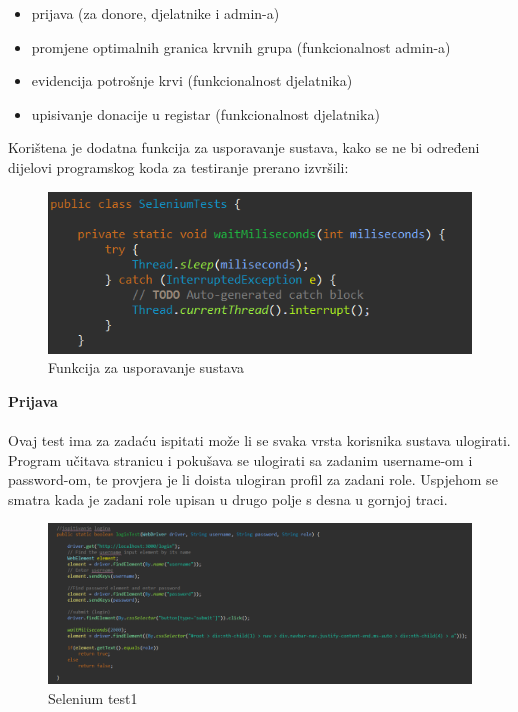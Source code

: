 			 \begin{itemize}
			 	\item {prijava (za donore, djelatnike i admin-a)}
			 	\item {promjene optimalnih granica krvnih grupa (funkcionalnost admin-a)}
			 	\item {evidencija potrošnje krvi (funkcionalnost djelatnika)}
			 	\item {upisivanje donacije u registar (funkcionalnost djelatnika)}
			 	
			 \end{itemize}
		 Korištena je dodatna funkcija za usporavanje sustava, kako se ne bi određeni dijelovi programskog koda za testiranje prerano izvršili:	
\begin{figure}[H]
	\centering
	\includegraphics[width=\textwidth, scale=0.5]{slike/wait}
	\caption{Funkcija za usporavanje sustava}
\end{figure}
\eject
\textbf{Prijava}	
\\\\
Ovaj test ima za zadaću ispitati može li se svaka vrsta korisnika sustava ulogirati. Program učitava stranicu i pokušava se ulogirati sa zadanim username­-om i password­-om, te provjera je li doista ulogiran profil za zadani role. Uspjehom se smatra kada je zadani role upisan u drugo polje s desna u gornjoj traci.
\begin{figure}[H]
	\centering
	\includegraphics[width=\textwidth, scale=0.5]{slike/selenium1}
	\caption{Selenium test1}
\end{figure}

